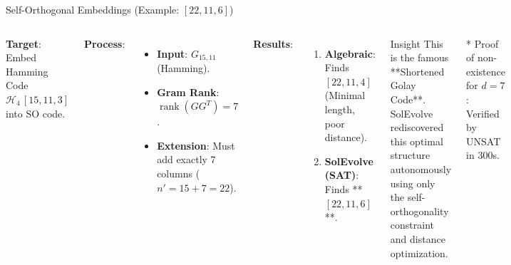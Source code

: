 \documentclass[10pt, aspectratio=169]{beamer}
\newcommand{\rank}{\operatorname{rank}}
\begin{document}
\begin{frame}{Self-Orthogonal Embeddings (Example: $[22,11,6]$)}
    \begin{columns}
        \textbf{Target}: Embed Hamming Code $\mathcal{H}_4\,[15,11,3]$ into SO code.
        
        \vspace{0.2cm}
        \textbf{Process}:
        \begin{itemize}
            \item \textbf{Input}: $G_{15,11}$ (Hamming).
            \item \textbf{Gram Rank}: $\rank(G G^T) = 7$.
            \item \textbf{Extension}: Must add exactly 7 columns ($n' = 15+7 = 22$).
        \end{itemize}
        
        \vspace{0.2cm}
        \textbf{Results}:
        \begin{enumerate}
            \item \textbf{Algebraic}: Finds $[22,11,4]$ (Minimal length, poor distance).
            \item \textbf{SolEvolve (SAT)}: Finds **$[22,11,6]$**.
        \end{enumerate}

        \begin{block}{Insight}
            This is the famous **Shortened Golay Code**. SolEvolve rediscovered this optimal structure autonomously using only the self-orthogonality constraint and distance optimization.
        \end{block}
        
        \vspace{0.2cm}
        \small
        * Proof of non-existence for $d=7$: Verified by UNSAT in 300s.
    \end{columns}
\end{frame}
\end{document}
